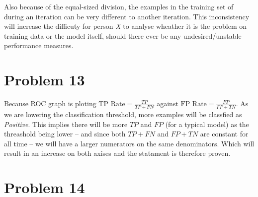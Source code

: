 \documentclass[12pt]{article}
\begin{document}
Also because of the equal-sized division, the examples in the training set of during an iteration can be very different to another iteration. This inconsistency will increase the difficuty for person \textit{X} to analyse wheather it is the problem on training data or the model itself, should there ever be any undesired/unstable performance measures.

\section{Problem 13}

Because ROC graph is ploting $\text{TP Rate} = \frac{TP}{TP + FN}$ against $\text{FP Rate} = \frac{FP}{FP + TN}$. As we are lowering the classification threshold, more examples will be classfied as \textit{Positive}. This implies there will be more $TP$ and $FP$ (for a typical model) as the threashold being lower -- and since both $TP + FN$ and $FP + TN$ are constant for all time -- we will have a larger numerators on the same denominators. Which will result in an increase on both axises and the statament is therefore proven.

\section{Problem 14}



% 
% 
\end{document}
